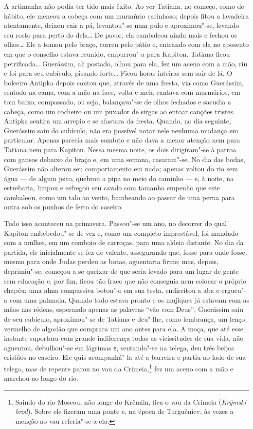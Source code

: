 A artimanha não podia ter tido mais êxito. Ao ver Tatiana, no
começo, como de hábito, ele meneou a cabeça com um murmúrio carinhoso;
depois fitou a lavadeira atentamente, deixou cair a pá, levantou"-se num
pulo e aproximou"-se, levando seu rosto para perto do dela\ldots{} De pavor,
ela cambaleou ainda mais e fechou os olhos\ldots{} Ele a tomou pelo braço,
correu pelo pátio e, entrando com ela no aposento em que o conselho
estava reunido, empurrou"-a para Kapiton. Tatiana ficou petrificada\ldots{}
Guerássim, ali postado, olhou para ela, fez um aceno com a mão, riu e
foi para seu cubículo, pisando forte\ldots{} Ficou horas inteiras sem sair de
lá. O boleeiro Antipka depois contou que, através de uma fresta, via
como Guerássim, sentado na cama, com a mão na face, volta e meia cantava
com murmúrios, em tom baixo, compassado, ou seja, balançava"-se de olhos
fechados e sacudia a cabeça, como um cocheiro ou um puxador de sirgas ao
entoar canções tristes. Antipka sentira um arrepio e se afastara da
fresta. Quando, no dia seguinte, Guerássim saiu do cubículo, não era
possível notar nele nenhuma mudança em particular. Apenas parecia mais
sombrio e não dava a menor atenção nem para Tatiana nem para Kapiton.
Nessa mesma noite, os dois dirigiram"-se à patroa com gansos debaixo do
braço e, em uma semana, casaram"-se. No dia das bodas, Guerássim não
alterou seu comportamento em nada; apenas voltou do rio sem água --- de
algum jeito, quebrou a pipa no meio do caminho --- e, à noite, na
estrebaria, limpou e esfregou seu cavalo com tamanho empenho que este
cambaleou, como um talo ao vento, bambeando ao passar de uma perna para
outra sob os punhos de ferro do caseiro.

Tudo isso aconteceu na primavera. Passou"-se um ano, no decorrer do qual
Kapiton embebedou"-se de vez e, como um completo imprestável, foi mandado
com a mulher, em um comboio de carroças, para uma aldeia distante. No
dia da partida, ele inicialmente se fez de valente, assegurando que,
fosse para onde fosse, mesmo para onde Judas perdeu as botas, aguentaria
firme; mas, depois, deprimiu"-se, começou a se queixar de que seria
levado para um lugar de gente sem educação e, por fim, ficou tão fraco que não conseguia nem colocar o próprio chapéu; uma alma compassiva
botou"-o em sua testa, endireitou a aba e ergueu"-a com uma palmada.
Quando tudo estava pronto e os mujiques já estavam com as mãos nas
rédeas, esperando apenas as palavras ``vão com Deus'', Guerássim saiu de
seu cubículo, aproximou"-se de Tatiana e deu"-lhe, como lembrança, um
lenço vermelho de algodão que comprara um ano antes para ela. A moça,
que até esse instante suportara com grande indiferença todas as
vicissitudes de sua vida, não aguentou, debulhou"-se em lágrimas е,
sentando"-se na telega, deu três beijos cristãos no caseiro. Ele quis
acompanhá"-la até a barreira e partiu ao lado de sua telega, mas de
repente parou no vau da Crimeia,\footnote{Saindo do rio Moscou, não
  longe do Krêmlin, fica o vau da Crimeia (\emph{Krýmski brod}). Sobre
  ele fizeram uma ponte e, na época de Turguêniev, às vezes a menção ao vau referia"-se a ela.} fez um aceno com a mão e marchou ao longo
do rio.

